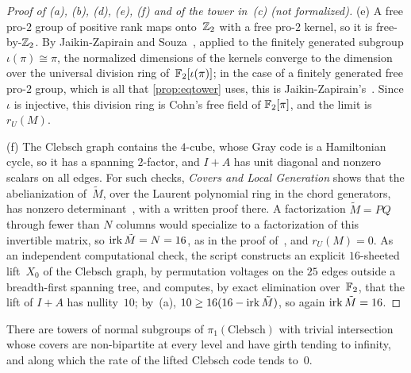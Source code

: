 \begin{proof}[Proof of (a), (b), (d), (e), (f) and of the tower in~(c) (not formalized)]
(e) A free pro-$2$ group of positive rank maps onto~$\mathbb{Z}_2$ with a free pro-$2$ kernel, so it is free-by-$\mathbb{Z}_2$. By
Jaikin-Zapirain and Souza~\cite[Theorem~8.1]{JaikinSouza2026}, applied to the finitely generated subgroup $\iota(\pi)\cong\pi$,
the normalized dimensions of the kernels converge to the dimension over the universal division ring of~$\mathbb{F}_2[\iota(\pi)]$; in the
case of a finitely generated free pro-$2$ group, which is all that \cref{prop:eqtower} uses, this is
Jaikin-Zapirain's~\cite[Proposition~3.5]{JaikinZapirain2024}. Since $\iota$ is injective, this division ring is Cohn's free field
of $\mathbb{F}_2[\pi]$, and the limit is $r_U(M)$.

(f) The Clebsch graph contains the $4$-cube, whose Gray code is a Hamiltonian cycle, so it has a spanning $2$-factor, and
$I+A$ has unit diagonal and nonzero scalars on all edges. For such checks, \emph{Covers and Local Generation} shows that the
abelianization of~$\tilde M$, over the Laurent polynomial ring in the chord generators, has nonzero
determinant~\cite[Lemma~6.1]{Covers2026}, with a written proof there. A factorization $\tilde M=PQ$ through fewer than $N$
columns would specialize to a factorization of this invertible matrix, so $\operatorname{irk}\tilde M=N=16$, as in the proof
of~\cite[Theorem~6.2]{Covers2026}, and $r_U(M)=0$. As an independent computational check, the script
 constructs an explicit $16$-sheeted lift~$X_0$ of the Clebsch graph, by permutation voltages
on the $25$ edges outside a breadth-first spanning tree, and computes, by exact elimination over~$\mathbb{F}_2$, that the lift of
$I+A$ has nullity~$10$; by~(a), $10\ge16(16-\operatorname{irk}\tilde M)$, so again $\operatorname{irk}\tilde M=16$.
\end{proof}

\begin{proposition}\label{prop:eqtower}
\notformalized
There are towers of normal subgroups of $\pi_1(\mathrm{Clebsch})$ with trivial intersection whose covers are non-bipartite at
every level and have girth tending to infinity, and along which the rate of the lifted Clebsch code tends to~$0$.
\end{proposition}


